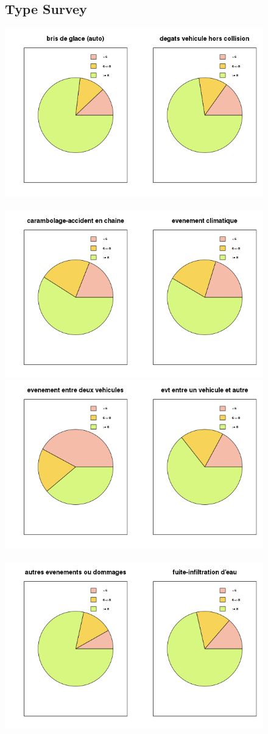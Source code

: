 \documentclass[a4paper, 11pt]{article}
\begin{document}
  

    \begin{figure}[!ht]
    \subsection{Type Survey}
    	\centering
            \includegraphics[width = 8.5 cm]{Remi/Level_of_satisfaction_according_to_TYPE_OF_SURVEY2.png}~
            \includegraphics[width = 8.5 cm]{Remi/Level_of_satisfaction_according_to_TYPE_OF_SURVEY4.png}
            \includegraphics[width = 8.5 cm]{Remi/Level_of_satisfaction_according_to_TYPE_OF_SURVEY6.png}~
            \includegraphics[width = 8.5 cm]{Remi/Level_of_satisfaction_according_to_TYPE_OF_SURVEY8.png}

\end{figure}
\end{document}
